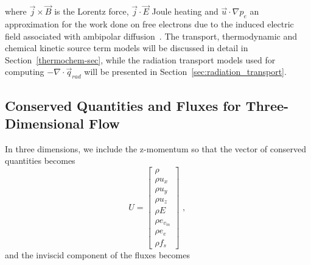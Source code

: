 where $ \vec{j} \times \vec{B}$ is the Lorentz force, $\vec{j} \cdot \vec{E}$ Joule heating and $\vec{u} \cdot \nabla p_e$ an approximation for the work done on free electrons due to the induced electric field associated with ambipolar diffusion~\cite{appleton_1964,Lee84}.
The transport, thermodynamic and chemical kinetic source term models 
will be discussed in detail in Section~\ref{thermochem-sec}, while the radiation transport models
used for computing $-\nabla \cdot \vec{q}_{rad}$ will be presented in Section~\ref{sec:radiation_transport}.

\subsection{Conserved Quantities and Fluxes for Three-Dimensional Flow}
%
In three dimensions, we include the z-momentum so that the vector of conserved quantities becomes
\begin{equation}
 U = \left [ \begin{array}{c} \rho \\ 
                              \rho u_{x} \\ 
                              \rho u_{y} \\ 
                              \rho u_{z} \\ 
                              \rho E \\ 
                              \rho e_{v_{m}} \\ 
                              \rho e_{e} \\
                              \rho f_{s} 
             \end{array} \right ] \text{ , }
 \label{eq:U_vector_3D}
\end{equation}
and the inviscid component of the fluxes becomes
